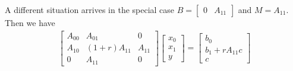 A different situation arrives in the special case $B = \begin{bmatrix}0&A_{11}\end{bmatrix}$ and $M=A_{11}$. Then we have
%
\begin{align*}
\begin{bmatrix}
A_{00} & A_{01} & 0\\
A_{10} & (1+r)A_{11} & A_{11}\\
0 & A_{11}& 0
\end{bmatrix}
\begin{bmatrix}
x_0\\x_1\\y
\end{bmatrix}
=
\begin{bmatrix}
b_0\\b_1+rA_{11} c\\c
\end{bmatrix}
\end{align*}
%


%
\printbibliography[title=References Section~\thesection]

